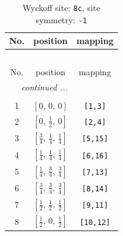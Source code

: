 \documentclass[fleqn,8pt]{jsarticle}
\begin{document}
\renewcommand{\arraystretch}{1.2}
\begin{longtable}{ccc}
\caption{Wyckoff site: {\tt 8c}, site symmetry: {\tt -1}}
 \\
 \hline \hline
No. & position & mapping \\ \hline \endfirsthead

\multicolumn{2}{l}{\tablename\ \thetable{}} \\
 \hline \hline
No. & position & mapping \\ \hline \endhead

 \hline \hline
\multicolumn{2}{r}{\footnotesize\it continued ...} \\ \endfoot

 \hline \hline
\multicolumn{2}{r}{} \\ \endlastfoot

1 & $\left[ 0,\, 0,\, 0 \right]$ & {\tt [1,3]} \\ \hline
2 & $\left[ 0,\, \frac{1}{2},\, 0 \right]$ & {\tt [2,4]} \\ \hline
3 & $\left[ \frac{3}{4},\, \frac{1}{4},\, \frac{1}{4} \right]$ & {\tt [5,15]} \\ \hline
4 & $\left[ \frac{1}{4},\, \frac{1}{4},\, \frac{1}{4} \right]$ & {\tt [6,16]} \\ \hline
5 & $\left[ \frac{1}{4},\, \frac{3}{4},\, \frac{3}{4} \right]$ & {\tt [7,13]} \\ \hline
6 & $\left[ \frac{3}{4},\, \frac{3}{4},\, \frac{3}{4} \right]$ & {\tt [8,14]} \\ \hline
7 & $\left[ \frac{1}{2},\, \frac{1}{2},\, \frac{1}{2} \right]$ & {\tt [9,11]} \\ \hline
8 & $\left[ \frac{1}{2},\, 0,\, \frac{1}{2} \right]$ & {\tt [10,12]} \\
\end{longtable}
\renewcommand{\arraystretch}{1.2}
\end{document}
